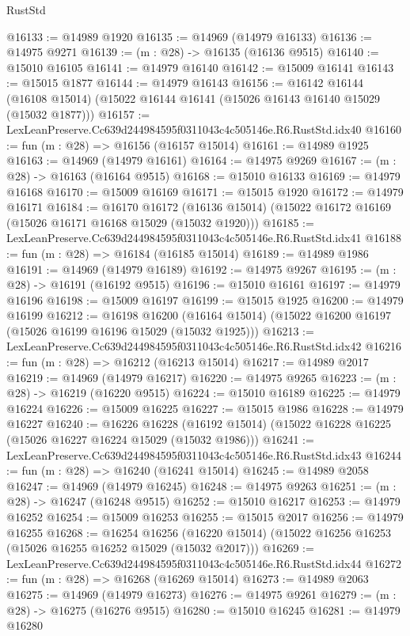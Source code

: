 \begin{lexlean}{RustStd}
\begin{coremodule}
@16133 := @14989 @1920
@16135 := @14969 (@14979 @16133)
@16136 := @14975 @9271
@16139 := (m : @28) -> @16135 (@16136 @9515)
@16140 := @15010 @16105
@16141 := @14979 @16140
@16142 := @15009 @16141
@16143 := @15015 @1877
@16144 := @14979 @16143
@16156 := @16142
    @16144
    (@16108 @15014)
    (@15022 @16144 @16141 (@15026 @16143 @16140 @15029 (@15032 @1877)))
@16157 := LexLeanPreserve.Cc639d244984595f0311043c4c505146e.R6.RustStd.idx40
@16160 := fun (m : @28) => @16156 (@16157 @15014)
@16161 := @14989 @1925
@16163 := @14969 (@14979 @16161)
@16164 := @14975 @9269
@16167 := (m : @28) -> @16163 (@16164 @9515)
@16168 := @15010 @16133
@16169 := @14979 @16168
@16170 := @15009 @16169
@16171 := @15015 @1920
@16172 := @14979 @16171
@16184 := @16170
    @16172
    (@16136 @15014)
    (@15022 @16172 @16169 (@15026 @16171 @16168 @15029 (@15032 @1920)))
@16185 := LexLeanPreserve.Cc639d244984595f0311043c4c505146e.R6.RustStd.idx41
@16188 := fun (m : @28) => @16184 (@16185 @15014)
@16189 := @14989 @1986
@16191 := @14969 (@14979 @16189)
@16192 := @14975 @9267
@16195 := (m : @28) -> @16191 (@16192 @9515)
@16196 := @15010 @16161
@16197 := @14979 @16196
@16198 := @15009 @16197
@16199 := @15015 @1925
@16200 := @14979 @16199
@16212 := @16198
    @16200
    (@16164 @15014)
    (@15022 @16200 @16197 (@15026 @16199 @16196 @15029 (@15032 @1925)))
@16213 := LexLeanPreserve.Cc639d244984595f0311043c4c505146e.R6.RustStd.idx42
@16216 := fun (m : @28) => @16212 (@16213 @15014)
@16217 := @14989 @2017
@16219 := @14969 (@14979 @16217)
@16220 := @14975 @9265
@16223 := (m : @28) -> @16219 (@16220 @9515)
@16224 := @15010 @16189
@16225 := @14979 @16224
@16226 := @15009 @16225
@16227 := @15015 @1986
@16228 := @14979 @16227
@16240 := @16226
    @16228
    (@16192 @15014)
    (@15022 @16228 @16225 (@15026 @16227 @16224 @15029 (@15032 @1986)))
@16241 := LexLeanPreserve.Cc639d244984595f0311043c4c505146e.R6.RustStd.idx43
@16244 := fun (m : @28) => @16240 (@16241 @15014)
@16245 := @14989 @2058
@16247 := @14969 (@14979 @16245)
@16248 := @14975 @9263
@16251 := (m : @28) -> @16247 (@16248 @9515)
@16252 := @15010 @16217
@16253 := @14979 @16252
@16254 := @15009 @16253
@16255 := @15015 @2017
@16256 := @14979 @16255
@16268 := @16254
    @16256
    (@16220 @15014)
    (@15022 @16256 @16253 (@15026 @16255 @16252 @15029 (@15032 @2017)))
@16269 := LexLeanPreserve.Cc639d244984595f0311043c4c505146e.R6.RustStd.idx44
@16272 := fun (m : @28) => @16268 (@16269 @15014)
@16273 := @14989 @2063
@16275 := @14969 (@14979 @16273)
@16276 := @14975 @9261
@16279 := (m : @28) -> @16275 (@16276 @9515)
@16280 := @15010 @16245
@16281 := @14979 @16280

\end{coremodule}
\end{lexlean}
